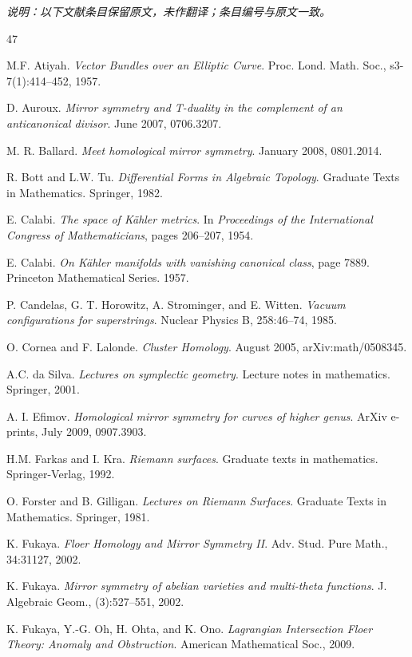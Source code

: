 \documentclass[11pt,a4paper]{article}
\theoremstyle{plain}
\theoremstyle{definition}
\begin{document}
\medskip
\noindent\textit{说明：以下文献条目保留原文，未作翻译；条目编号与原文一致。}

\begin{thebibliography}{47}

 M.F. Atiyah. \emph{Vector Bundles over an Elliptic Curve}. Proc. Lond. Math. Soc., s3-7(1):414--452, 1957.

 D. Auroux. \emph{Mirror symmetry and T-duality in the complement of an anticanonical divisor}. June 2007, 0706.3207.

 M. R. Ballard. \emph{Meet homological mirror symmetry}. January 2008, 0801.2014.

 R. Bott and L.W. Tu. \emph{Differential Forms in Algebraic Topology}. Graduate Texts in Mathematics. Springer, 1982.

 E. Calabi. \emph{The space of Kähler metrics}. In \emph{Proceedings of the International Congress of Mathematicians}, pages 206--207, 1954.

 E. Calabi. \emph{On Kähler manifolds with vanishing canonical class}, page 7889. Princeton Mathematical Series. 1957.

 P. Candelas, G. T. Horowitz, A. Strominger, and E. Witten. \emph{Vacuum configurations for superstrings}. Nuclear Physics B, 258:46--74, 1985.

 O. Cornea and F. Lalonde. \emph{Cluster Homology}. August 2005, arXiv:math/0508345.

 A.C. da Silva. \emph{Lectures on symplectic geometry}. Lecture notes in mathematics. Springer, 2001.

 A. I. Efimov. \emph{Homological mirror symmetry for curves of higher genus}. ArXiv e-prints, July 2009, 0907.3903.

 H.M. Farkas and I. Kra. \emph{Riemann surfaces}. Graduate texts in mathematics. Springer-Verlag, 1992.

 O. Forster and B. Gilligan. \emph{Lectures on Riemann Surfaces}. Graduate Texts in Mathematics. Springer, 1981.

 K. Fukaya. \emph{Floer Homology and Mirror Symmetry II}. Adv. Stud. Pure Math., 34:31127, 2002.

 K. Fukaya. \emph{Mirror symmetry of abelian varieties and multi-theta functions}. J. Algebraic Geom., (3):527--551, 2002.

 K. Fukaya, Y.-G. Oh, H. Ohta, and K. Ono. \emph{Lagrangian Intersection Floer Theory: Anomaly and Obstruction}. American Mathematical Soc., 2009.


\end{thebibliography}
\end{document}
